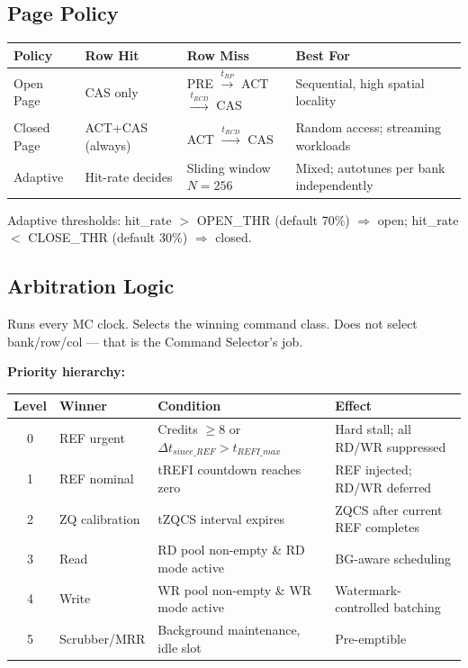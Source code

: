 \documentclass[10pt,a4paper]{article}
\newcommand{\Th}[1]{\cellcolor{cellbg}\textbf{\small #1}}
\newcommand{\RA}{\rowcolor{white}}
\newcommand{\RB}{\rowcolor{altbg}}
\begin{document}
\subsection{Page Policy}

\begin{center}
\begin{tabularx}{\linewidth}{@{} l l l X @{}}
\toprule
\Th{Policy} & \Th{Row Hit} & \Th{Row Miss} & \Th{Best For} \\
\midrule
\RA Open Page & CAS only & PRE $\xrightarrow{t_{RP}}$ ACT $\xrightarrow{t_{RCD}}$ CAS & Sequential, high spatial locality \\
\RB Closed Page & ACT+CAS (always) & ACT $\xrightarrow{t_{RCD}}$ CAS & Random access; streaming workloads \\
\RA Adaptive & Hit-rate decides & Sliding window $N=256$ & Mixed; autotunes per bank independently \\
\bottomrule
\end{tabularx}
\end{center}

Adaptive thresholds: hit\_rate $>$ OPEN\_THR (default 70\%) $\Rightarrow$ open;
hit\_rate $<$ CLOSE\_THR (default 30\%) $\Rightarrow$ closed.

\subsection{Arbitration Logic}

Runs every MC clock. Selects the winning command class. Does not select bank/row/col --- that is
the Command Selector's job.

\textbf{Priority hierarchy:}

\begin{center}
\begin{tabularx}{\linewidth}{@{} c l l X @{}}
\toprule
\Th{Level} & \Th{Winner} & \Th{Condition} & \Th{Effect} \\
\midrule
\RA 0 & REF urgent & Credits $\geq 8$ or $\Delta t_{since\_REF} > t_{REFI\_max}$ & Hard stall; all RD/WR suppressed \\
\RB 1 & REF nominal & tREFI countdown reaches zero & REF injected; RD/WR deferred \\
\RA 2 & ZQ calibration & tZQCS interval expires & ZQCS after current REF completes \\
\RB 3 & Read & RD pool non-empty \& RD mode active & BG-aware scheduling \\
\RA 4 & Write & WR pool non-empty \& WR mode active & Watermark-controlled batching \\
\RB 5 & Scrubber/MRR & Background maintenance, idle slot & Pre-emptible \\
\bottomrule
\end{tabularx}
\end{center}
\end{document}
